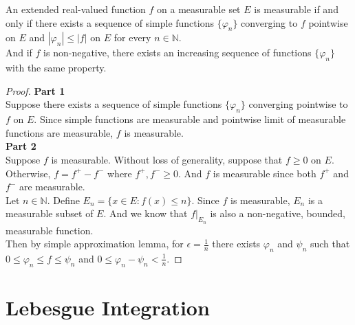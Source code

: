 \begin{theorem}
	An extended real-valued function $f$ on a measurable set $E$ is measurable if and only if there exists a sequence of simple functions $\{ \varphi_n \}$ converging to $f$ pointwise on $E$ and $|\varphi_n| \le |f|$ on $E$ for every $n \in \mathbb{N}$.\\
	And if $f$ is non-negative, there exists an increasing sequence of functions $\{ \varphi_n \}$ with the same property.
\end{theorem}
\begin{proof}
	\textbf{Part 1}\\
	Suppose there exists a sequence of simple functions $\{\varphi_n \}$ converging pointwise to $f$ on $E$.
	Since simple functions are measurable and pointwise limit of measurable functions are measurable, $f$ is measurable.\\

	\textbf{Part 2}\\	
	Suppose $f$ is measurable.
	Without loss of generality, suppose that $f \ge 0$ on $E$.
	Otherwise, $f = f^+ - f^-$ where $f^+,f^- \ge 0$.
	And $f$ is measurable since both $f^+$ and $f^-$ are measurable.\\

	Let $n \in \mathbb{N}$.
	Define $E_n = \{ x \in E : f(x) \le n \}$.
	Since $f$ is measurable, $E_n$ is a measurable subset of $E$.
	And we know that $f|_{E_n}$ is also a non-negative, bounded, measurable function.\\

	Then by simple approximation lemma, for $\epsilon = \frac{1}{n}$ there exists $\varphi_n$ and $\psi_n$ such that $0 \le \varphi_n \le f \le \psi_n$ and $0 \le \varphi_n - \psi_n < \frac{1}{n}$.
\end{proof}


\section{Lebesgue Integration}

